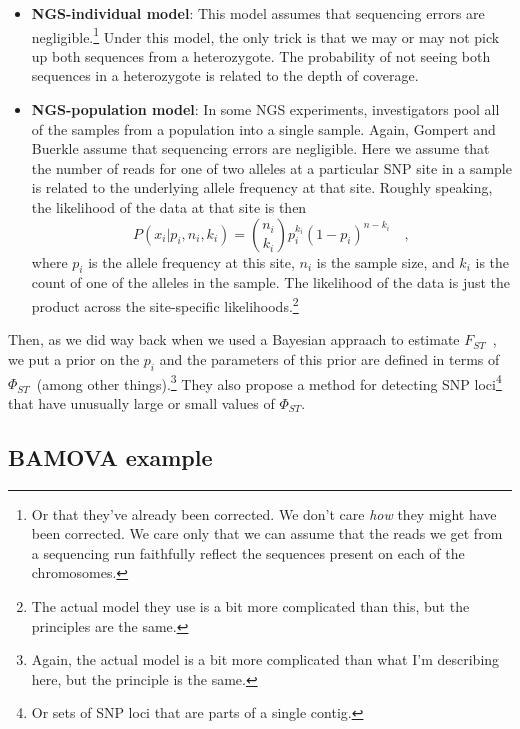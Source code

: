 \begin{itemize}

\item {\bf NGS-individual model}: This model assumes that sequencing
  errors are negligible.\footnote{Or that they've already been
    corrected. We don't care {\it how\/} they might have been
    corrected. We care only that we can assume that the reads we get
    from a sequencing run faithfully reflect the sequences present on
    each of the chromosomes.} Under this model, the only trick is that
  we may or may not pick up both sequences from a heterozygote. The
  probability of not seeing both sequences in a heterozygote is
  related to the depth of coverage.

\item {\bf NGS-population model}: In some NGS experiments,
  investigators pool all of the samples from a population into a
  single sample. Again, Gompert and Buerkle assume that sequencing
  errors are negligible. Here we assume that the number of reads for
  one of two alleles at a particular SNP site in a sample is related
  to the underlying allele frequency at that site. Roughly speaking,
  the likelihood of the data at that site is then
\[
P(x_i|p_i,n_i, k_i) = {n_i \choose k_i}p_i^{k_i}(1-p_{i})^{n-k_i}
\quad ,
\]
where $p_i$ is the allele frequency at this site, $n_i$ is the sample
size, and $k_i$ is the count of one of the alleles in the sample. The
likelihood of the data is just the product across the site-specific
likelihoods.\footnote{The actual model they use is a bit more
  complicated than this, but the principles are the same.}

\end{itemize}

Then, as we did way back when we used a Bayesian appraach to estimate
$F_{ST}$~\cite{Holsinger-Wallace-2004}, we put a prior on the $p_i$
and the parameters of this prior are defined in terms of
$\Phi_{ST}$~(among other things).\footnote{Again, the actual model is
  a bit more complicated than what I'm describing here, but the
  principle is the same.} They also propose a method for detecting SNP
loci\footnote{Or sets of SNP loci that are parts of a single contig.}
that have unusually large or small values of $\Phi_{ST}$.

\subsection*{BAMOVA example}

